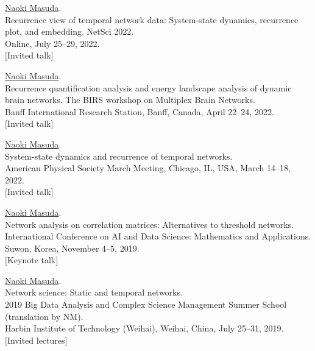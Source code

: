 \documentclass[11pt,letter]{article}
\begin{document}
\begin{etaremune}
\item \underline{Naoki Masuda}.\\
Recurrence view of temporal network data: System-state dynamics, recurrence plot, and embedding.
NetSci 2022.\\
Online, July 25--29, 2022.\\
$[$Invited talk$]$

\item \underline{Naoki Masuda}.\\
Recurrence quantification analysis and energy landscape analysis of dynamic brain networks.
The BIRS workshop on Multiplex Brain Networks.\\
Banff International Research Station, Banff, Canada, April 22--24, 2022.\\
$[$Invited talk$]$
%


\item \underline{Naoki Masuda}.\\
System-state dynamics and recurrence of temporal networks.\\
American Physical Society March Meeting, Chicago, IL, USA, March 14--18, 2022.\\
%
$[$Invited talk$]$

\item \underline{Naoki Masuda}.\\
Network analysis on correlation matrices: Alternatives to threshold networks.\\
International Conference on AI and Data Science: Mathematics and Applications.\\
Suwon, Korea, November 4--5, 2019.\\
$[$Keynote talk$]$

\item \underline{Naoki Masuda}.\\
Network science: Static and temporal networks.\\
2019 Big Data Analysis and Complex Science Management Summer School (translation by NM).\\
Harbin Institute of Technology (Weihai), Weihai, China, July 25--31, 2019.\\
$[$Invited lectures$]$


\end{etaremune}
\end{document}
